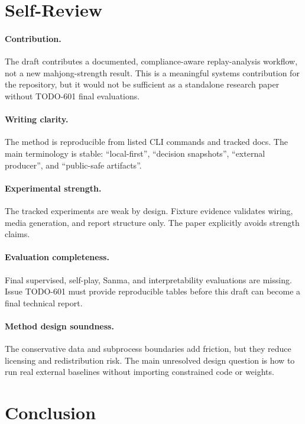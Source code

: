 \documentclass[11pt]{article}
\begin{document}
\section{Self-Review}

\paragraph{Contribution.}
The draft contributes a documented, compliance-aware replay-analysis workflow, not a new
mahjong-strength result. This is a meaningful systems contribution for the repository, but it would
not be sufficient as a standalone research paper without TODO-601 final evaluations.

\paragraph{Writing clarity.}
The method is reproducible from listed CLI commands and tracked docs. The main terminology is
stable: ``local-first'', ``decision snapshots'', ``external producer'', and ``public-safe
artifacts''.

\paragraph{Experimental strength.}
The tracked experiments are weak by design. Fixture evidence validates wiring, media generation,
and report structure only. The paper explicitly avoids strength claims.

\paragraph{Evaluation completeness.}
Final supervised, self-play, Sanma, and interpretability evaluations are missing. Issue TODO-601
must provide reproducible tables before this draft can become a final technical report.

\paragraph{Method design soundness.}
The conservative data and subprocess boundaries add friction, but they reduce licensing and
redistribution risk. The main unresolved design question is how to run real external baselines
without importing constrained code or weights.

\section{Conclusion}
\end{document}
